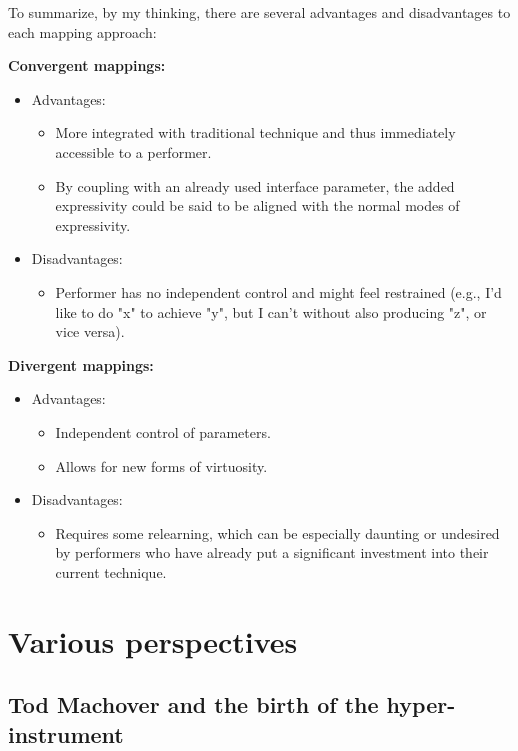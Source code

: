 \documentclass[12pt,twoside,maitrise]{dms_ks}
\theoremstyle{definition}
\begin{document}
To summarize, by my thinking, there are several advantages and disadvantages to each mapping approach:

\textbf{Convergent mappings:}

\begin{itemize}
  \item Advantages:
  \begin{itemize}
    \item More integrated with traditional technique and thus immediately accessible to a performer.
    \item By coupling with an already used interface parameter, the added expressivity could be said to be aligned with the normal modes of expressivity.
  \end{itemize}
  \item Disadvantages:
  \begin{itemize}
    \item Performer has no independent control and might feel restrained (e.g., I'd like to do "x" to achieve "y", but I can't without also producing "z", or vice versa).
  \end{itemize}
\end{itemize}

\textbf{Divergent mappings:}

\begin{itemize}
  \item Advantages:
  \begin{itemize}
    \item Independent control of parameters.
    \item Allows for new forms of virtuosity.
  \end{itemize}
  \item Disadvantages:
  \begin{itemize}
    \item Requires some relearning, which can be especially daunting or undesired by performers who have already put a significant investment into their current technique.
  \end{itemize}
\end{itemize}

\section{Various perspectives}

\subsection{Tod Machover and the birth of the hyper-instrument}
\end{document}
